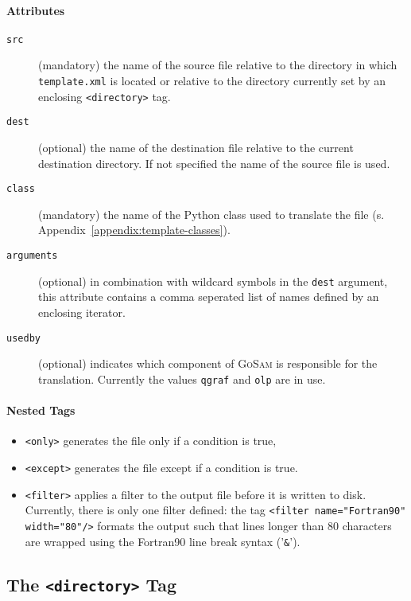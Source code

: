 \documentclass[11pt,a4paper]{refrep}
\newcommand{\golem}{\textsc{GoSam}\xspace}
\begin{document}
\paragraph{Attributes}
\begin{description}
\item[\texttt{src}] (mandatory) the name of the source file relative
   to the directory in which \texttt{template.xml} is located or
   relative to the directory currently set by an enclosing
   \texttt{<directory>} tag.
\item[\texttt{dest}] (optional) the name of the destination file
   relative to the current destination directory. If not specified
   the name of the source file is used.
\item[\texttt{class}]
   (mandatory) the name of the Python class
   used to translate the file (s. Appendix~\ref{appendix:template-classes}).
\item[\texttt{arguments}] (optional) in combination with wildcard symbols
   in the \texttt{dest} argument, this attribute contains a comma seperated
   list of names defined by an enclosing iterator.
\item[\texttt{usedby}] (optional) indicates which component of \golem{}
   is responsible for the translation. Currently the values \texttt{qgraf}
   and \texttt{olp} are in use.
\end{description}

\paragraph{Nested Tags}
\begin{itemize}
\item \texttt{<only>} generates the file only if a condition is true,
\item \texttt{<except>} generates the file except if a condition is true.
\item \texttt{<filter>} applies a filter to the output file before it is
   written to disk. Currently, there is only one filter defined:
   the tag \texttt{<filter name="Fortran90" width="80"/>} formats the
   output such that lines longer than 80 characters are wrapped using
   the Fortran90 line break syntax ('\texttt{\&}').
\end{itemize}

\subsection{The \texttt{<directory>} Tag}
\end{document}

